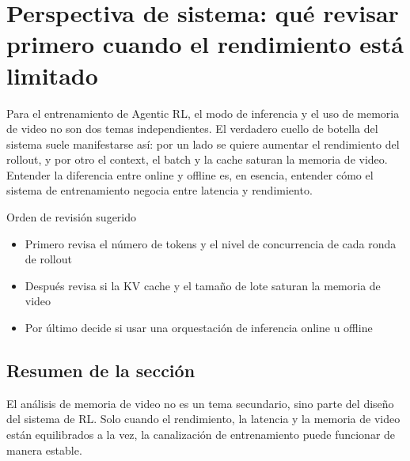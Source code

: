 \section{Perspectiva de sistema: qué revisar primero cuando el rendimiento está limitado}
Para el entrenamiento de Agentic RL, el modo de inferencia y el uso de memoria de video no son dos temas independientes. El verdadero cuello de botella del sistema suele manifestarse así: por un lado se quiere aumentar el rendimiento del rollout, y por otro el context, el batch y la cache saturan la memoria de video. Entender la diferencia entre online y offline es, en esencia, entender cómo el sistema de entrenamiento negocia entre latencia y rendimiento.

\begin{knowledgebox}{Orden de revisión sugerido}
\begin{itemize}
  \item Primero revisa el número de tokens y el nivel de concurrencia de cada ronda de rollout
  \item Después revisa si la KV cache y el tamaño de lote saturan la memoria de video
  \item Por último decide si usar una orquestación de inferencia online u offline
\end{itemize}
\end{knowledgebox}

\subsection{Resumen de la sección}
El análisis de memoria de video no es un tema secundario, sino parte del diseño del sistema de RL. Solo cuando el rendimiento, la latencia y la memoria de video están equilibrados a la vez, la canalización de entrenamiento puede funcionar de manera estable.

\newpage
